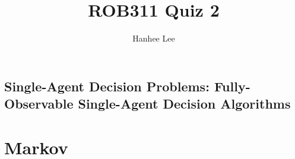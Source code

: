 \documentclass{article}
\title{ROB311 Quiz 2}
\author{Hanhee Lee}
\begin{document}
\maketitle

\tableofcontents
\newpage

\begin{center}
    \section*{Single-Agent Decision Problems: Fully-Observable Single-Agent Decision Algorithms}
\end{center}

\section{Markov}

\newpage
\end{document}
